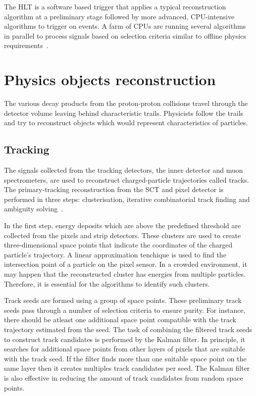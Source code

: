 The HLT is a software based trigger that applies a typical reconstruction algorithm at a preliminary stage 
followed by more advanced, CPU-intensive algorithms to trigger on events. A farm of CPUs are running several
algorithms in parallel to process signals based on selection criteria similar to offline physics requirements~\cite{C-Gabaldon_2012}.   



\section{Physics objects reconstruction}

The various decay products from the proton-proton collisions travel through the detector volume leaving
behind characteristic trails. Physicists follow the trails and try to reconstruct objects which would represent
characteristics of particles.

\subsection{Tracking}
The signals collected from the tracking detectors, the inner detector and muon spectrometers, are used to reconstruct charged-particle trajectories called tracks. The primary-tracking
reconstruction from the SCT and pixel detector is performed in three steps: clusterisation, iterative combinatorial track finding and ambiguity solving~\cite{Aaboud_2017}. 

In the first step, energy deposits which are above the predefined threshold are collected from the pixels and strip detectors. These clusters are used to create
three-dimensional space points that indicate the coordinates of the charged particle's trajectory. A linear approximation tenchique is used to find the intersection
point of a particle on the pixel sensor. In a crowded environment, it may happen that the reconstructed cluster has energies from multiple particles. Therefore,
it is essential for the algorithms to identify such clusters. 

Track seeds are formed using a group of space points. These preliminary track seeds pass through a number of selection criteria to ensure purity. For instance, there should be atleast one 
additional space point compatible with the track trajectory estimated from the seed. The task of combining the filtered track seeds to construct track candidates is performed by 
the Kalman filter. In principle, it searches for additional space points from other layers of pixels that are suitable with the track seed. If the filter finds more than one suitable space 
point on the same layer then it creates multiples track candidates per seed. The Kalman filter is also effective in reducing the amount of track candidates from random space points. 

